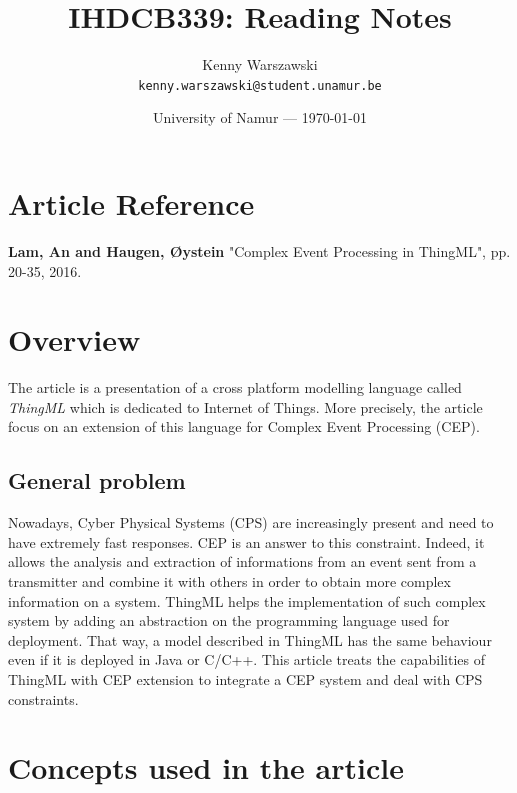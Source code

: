 \documentclass{article}
\title{IHDCB339: Reading Notes}
\author{Kenny Warszawski\\ \texttt{kenny.warszawski@student.unamur.be}}
\date{University of Namur --- \today}
\begin{document}
\maketitle 

\section{Article Reference}

\textbf{Lam, An and Haugen, Øystein} "Complex Event Processing in ThingML", pp. 20-35, 2016.

\section{Overview}

The article is a presentation of a cross platform modelling language called \textit{ThingML} which is dedicated to Internet of Things. More precisely, the article focus on an extension of this language for Complex Event Processing (CEP). 


\subsection{General problem}

Nowadays, Cyber Physical Systems (CPS) are increasingly present and need to have extremely fast responses. CEP is an answer to this constraint. Indeed, it allows the analysis and extraction of informations from an event sent from a transmitter and combine it with others in order to obtain more complex information on a system. ThingML helps the implementation of such complex system by adding an abstraction on the programming language used for deployment. That way, a model described in ThingML has the same behaviour even if it is deployed in Java or C/C++. This article treats the capabilities of ThingML with CEP extension to integrate a CEP system and deal with CPS constraints.


\section{Concepts used in the article}
\end{document}
